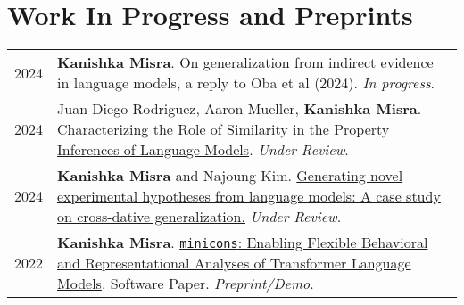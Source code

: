 \documentclass[11pt]{article}
\begin{document}
\section*{Work In Progress and Preprints}
\vspace{-1.5em}
\renewcommand*{\arraystretch}{1.5}
\begin{longtable}{p{}  p{} }
2024 & \textbf{Kanishka Misra}. On generalization from indirect evidence in language models, a reply to Oba et al (2024). \textit{In progress}.\\

2024 & Juan Diego Rodriguez, Aaron Mueller, \textbf{Kanishka Misra}. \href{https://arxiv.org/abs/2410.22590}{Characterizing the Role of Similarity in the Property Inferences of Language Models}. \textit{Under Review}.\\

2024 & \textbf{Kanishka Misra} and Najoung Kim. \href{https://arxiv.org/abs/2408.05086}{Generating novel experimental hypotheses from language models: A case study on cross-dative generalization.} \textit{Under Review}.\\

2022 & \textbf{Kanishka Misra}. \href{https://arxiv.org/abs/2203.13112}{\texttt{minicons}: Enabling Flexible Behavioral and Representational Analyses of Transformer Language Models}. Software Paper. \textit{Preprint/Demo}.
\end{longtable}
\end{document}
